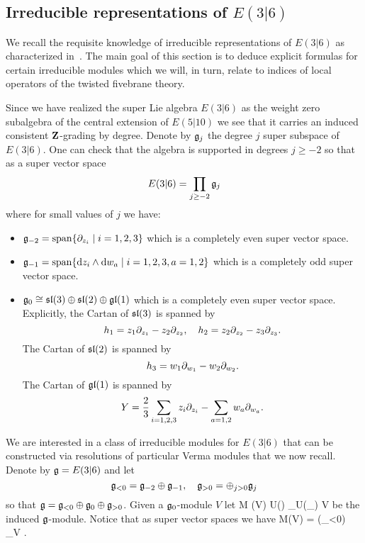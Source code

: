 \subsection{Irreducible representations of $E(3|6)$}
We recall the requisite knowledge of irreducible representations of $E(3|6)$ as characterized in~\cite{KR1,KR2,KR3}.
The main goal of this section is to deduce explicit formulas for certain irreducible modules which we will, in turn, relate to indices of local operators of the twisted fivebrane theory. 

Since we have realized the super Lie algebra $E(3|6)$ as the weight zero subalgebra of the central extension of $E(5|10)$ we see that it carries an induced consistent $\mathbf{Z}$-grading by degree. 
Denote by $\mathfrak g_j$ the degree $j$ super subspace of $E(3|6)$.
One can check that the algebra is supported in degrees $j \geq -2$ so that as a super vector space
\[
E(3|6) = \prod_{j \geq -2} \mathfrak g_j
\]
where for small values of $j$ we have:
\begin{itemize}
\item $\mathfrak g_{-2} = {\rm span}\{\partial_{z_i}\; | \; {i=1,2,3}\}$ which is a completely even super vector space. 
\item $\mathfrak g_{-1} = {\rm span}\{{\rm d} z_i \wedge {\rm d} w_a \; | \; i=1,2,3, a=1,2\}$ which is a completely odd super vector space.
\item $\mathfrak g_0 \cong \mathfrak{sl}(3) \oplus \mathfrak{sl}(2) \oplus \mathfrak{gl}(1)$ which is a completely even super vector space.
Explicitly, the Cartan of $\mathfrak{sl}(3)$ is spanned by 
\[
h_1 = z_1 \partial_{z_1} - z_2 \partial_{z_2}, \quad h_2 = z_2 \partial_{z_2} - z_3 \partial_{z_3} .
\]
The Cartan of $\mathfrak{sl}(2)$ is spanned by
\[
h_3 = w_1 \partial_{w_1} - w_2 \partial_{w_2} .
\]
The Cartan of $\mathfrak{gl}(1)$ is spanned by
\[
Y = \frac23 \sum_{i=1,2,3} z_i \partial_{z_i} - \sum_{a=1,2} w_a \partial_{w_a} .
\]
\end{itemize}

\parsec[s:vermas]

We are interested in a class of irreducible modules for $E(3|6)$ that can be constructed via resolutions of particular Verma modules \cite{KR2} that we now recall.
Denote by $\mathfrak g = E(3|6)$ and let 
\[
\mathfrak g_{<0} = \mathfrak g_{-2} \oplus \mathfrak g_{-1} , \quad \mathfrak{g}_{>0} = \oplus_{j>0} \mathfrak g_j 
\]
so that $\mathfrak g = \mathfrak g_{<0} \oplus \mathfrak g_0 \oplus \mathfrak g_{>0}$. 
Given a $\mathfrak g_0$-module $V$ let 
\beqn\label{eqn:verma1}
M (V)  U(\fg) \otimes_{U(\fg_{})} V 
\eeqn
be the induced $\mathfrak g$-module. 
Notice that as super vector spaces we have 
\beqn
M(V) = \Sym(\fg_{<0}) \otimes_\C V .
\eeqn

